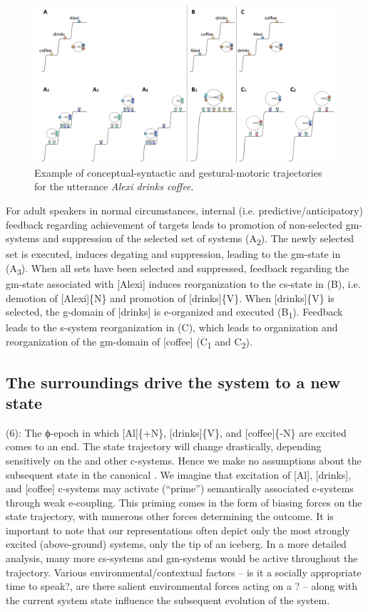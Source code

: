   
\begin{figure}
\includegraphics[width=\textwidth]{figures/Tilsen-img55.png}
\caption{Example of conceptual-syntactic and gestural-motoric trajectories for the utterance \textit{Alexi drinks coffee}.}
\label{fig:4:5}
\end{figure}
 

  For adult speakers in normal circumstances, internal (i.e. predictive/anticipatory) feedback regarding achievement of  targets leads to promotion of non-selected gm-systems and suppression of the selected set of systems (A\textsubscript{2}). The newly selected set is executed,  induces degating and suppression, leading to the gm-state in (A\textsubscript{3}). When all sets have been selected and suppressed, feedback regarding the gm-state associated with [Alexi] induces reorganization to the cs-state in (B), i.e. demotion of [Alexi]\{N\} and promotion of [drinks]\{V\}. When [drinks]\{V\} is selected, the g-domain of [drinks] is e-organized and executed (B\textsubscript{1}). Feedback leads to the s-system reorganization in (C), which leads to organization and reorganization of the gm-domain of [coffee] (C\textsubscript{1} and C\textsubscript{2}).

\subsection{The surroundings drive the system to a new state}

(6): The ϕ-epoch in which [Al]\{+N\}, [drinks]\{V\}, and [coffee]\{-N\} are excited comes to an end. The state trajectory will change drastically, depending sensitively on the  and other c-systems. Hence we make no assumptions about the subsequent state in the canonical . We imagine that excitation of [Al], [drinks], and [coffee] c-systems may activate (“prime”) semantically associated c-systems through weak e-coupling. This priming comes in the form of biasing forces on the state trajectory, with numerous other  forces determining the outcome. It is important to note that our representations often depict only the most strongly excited (above-ground) systems, only the tip of an iceberg. In a more detailed analysis, many more cs-systems and gm-systems would be active throughout the trajectory. Various environmental/contextual factors -- is it a socially appropriate time to speak?, are there salient environmental forces acting on a ? -- along with the current system state influence the subsequent evolution of the system. 

